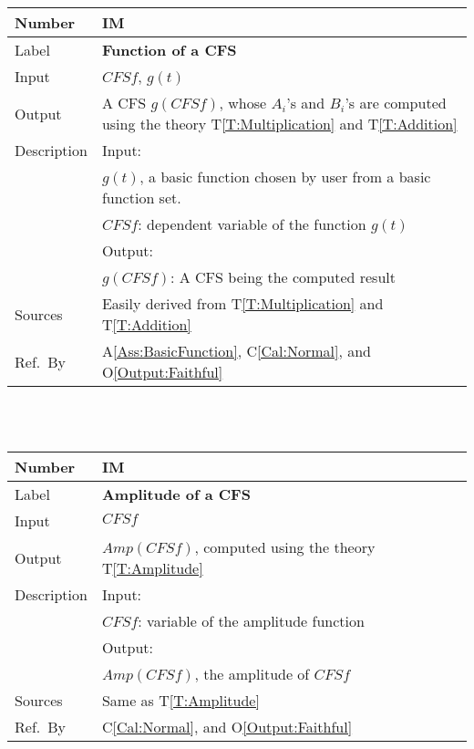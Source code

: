 \documentclass[12pt]{article}
\newcommand{\colAwidth}{0.13\textwidth}
\newcommand{\colBwidth}{0.82\textwidth}
\newcommand{\tref}[1]{T\ref{#1}}
\newcommand{\aref}[1]{A\ref{#1}}
\newcommand{\calref}[1]{C\ref{#1}}
\newcommand{\oref}[1]{O\ref{#1}}
\newcounter{instnum} %
\begin{document}
\noindent
\begin{minipage}{\textwidth}
	\renewcommand*{\arraystretch}{1.5}
	\begin{tabular}{| p{\colAwidth} | p{\colBwidth}|}
		\hline
		\rowcolor[gray]{0.9}
		Number& IM{instnum}\theinstnum 
		\label{IM:Function}\\
		\hline
		Label& \bf Function of a CFS \\
		\hline
		Input& $\mathit{CFSf}$, $g(t)$\\
		\hline
		Output& A CFS $g(CFSf)$, whose $A_i$'s and $B_i$'s 
		are computed using the theory \tref{T:Multiplication} 
		and \tref{T:Addition}\\
		\hline
		Description&Input:\\
		& $g(t)$, a basic function chosen by user from a 
		basic function set.\\
		&$\mathit{CFSf}$: dependent variable of the function $g(t)$\\
		&Output:\\
		& $g(CFSf)$: A CFS being the computed result\\
		\hline
		Sources&Easily derived from \tref{T:Multiplication} 
		and \tref{T:Addition}\\
		\hline
		Ref.\ By & \aref{Ass:BasicFunction}, \calref{Cal:Normal}, 
		and \oref{Output:Faithful}\\
		\hline
	\end{tabular}
\end{minipage}\\
~\newline

\noindent
\begin{minipage}{\textwidth}
	\renewcommand*{\arraystretch}{1.5}
	\begin{tabular}{| p{\colAwidth} | p{\colBwidth}|}
		\hline
		\rowcolor[gray]{0.9}
		Number& IM{instnum}\theinstnum 
		\label{IM:Amplitude}\\
		\hline
		Label& \bf Amplitude of a CFS \\
		\hline
		Input& $\mathit{CFSf}$\\
		\hline
		Output& $\mathit{Amp}(\mathit{CFSf})$, computed using the theory 
		\tref{T:Amplitude}\\
		\hline
		Description&Input:\\
		&$\mathit{CFSf}$: variable of the amplitude function\\
		&Output:\\
		& $\mathit{Amp}(\mathit{CFSf})$, the amplitude of $\mathit{CFSf}$\\
		\hline
		Sources&Same as \tref{T:Amplitude}		\\
		\hline
		Ref.\ By & \calref{Cal:Normal}, and  \oref{Output:Faithful}\\
		\hline
	\end{tabular}
\end{minipage}\\
~\newline
\end{document}
